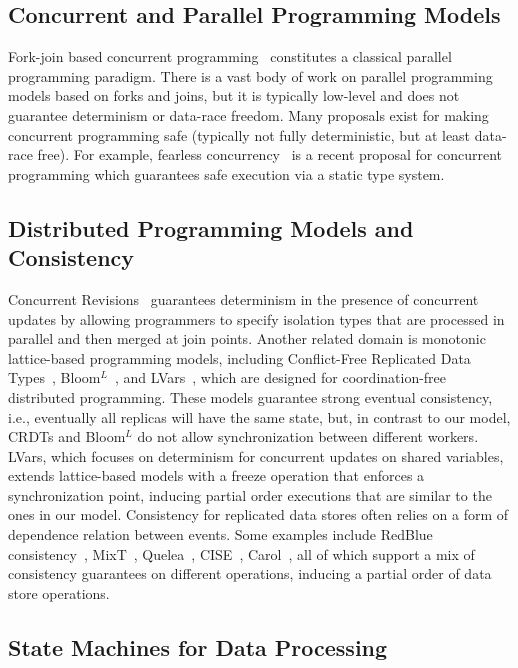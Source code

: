 \subsection{Concurrent and Parallel Programming Models}

Fork-join based
concurrent programming~\cite{frigo1998implementation,lea2000java}
constitutes a classical parallel programming paradigm.
There is a vast body of work on parallel programming models based on forks and joins, but it is typically low-level and does not guarantee determinism or data-race freedom.
Many proposals exist for making concurrent programming safe (typically not fully deterministic, but at least data-race free).
For example, fearless concurrency~\cite{milano2022flexible} is a recent proposal for concurrent programming which guarantees safe execution via a static type system.

\subsection{Distributed Programming Models and Consistency}

Concurrent Revisions~\cite{burckhardt2010concurrent}
guarantees determinism in the presence of concurrent updates by allowing programmers to specify isolation types that are processed in parallel and then merged at join points.
Another related domain is monotonic lattice-based programming models,
including
Conflict-Free Replicated Data Types~\cite{shapiro2011conflict},
Bloom$^L$~\cite{conway12},
and LVars~\cite{lvars13,lvars14},
which are designed for coordination-free distributed programming.
These models guarantee strong eventual consistency,
i.e., eventually all replicas will have the same state,
but, in contrast to our model, CRDTs and Bloom$^L$
do not allow synchronization between different workers.
LVars, which focuses on determinism for concurrent updates on shared variables,
extends lattice-based models with a freeze operation that enforces a synchronization point,
inducing partial order executions that are similar to the ones in our model.
Consistency for replicated data stores
often relies on a form of dependence relation between events.
Some examples include RedBlue consistency~\cite{li2012making},
MixT~\cite{milano2018mixt},
Quelea~\cite{sivaramakrishnan2015declarative},
CISE~\cite{gotsman16},
Carol~\cite{lewchenko2019sequential},
all of which support a mix of consistency guarantees on different operations,
inducing a partial order of data store operations.

\subsection{State Machines for Data Processing}

